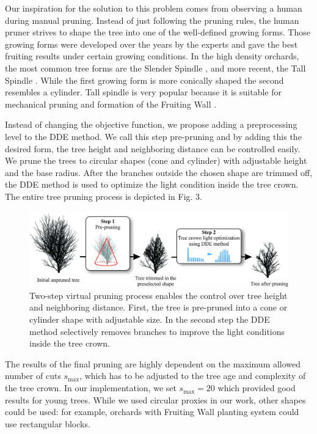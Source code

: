 \documentclass[1p]{elsarticle}
\begin{document}
Our inspiration for the solution to this problem comes from observing a
human during manual pruning. Instead of just following the pruning
rules, the human pruner strives to shape the tree into one of the
well-defined growing forms. Those growing forms were developed over the
years by the experts and gave the best fruiting results under certain
growing conditions. In the high density orchards, the most common tree
forms are the Slender Spindle \cite{weber_optimizing_2000}, and more recent, the Tall
Spindle \cite{robinson_vision_2013}. While the first growing form is more conically shaped
the second resembles a cylinder. Tall spindle is very popular because it
is suitable for mechanical pruning and formation of the Fruiting Wall
\cite{robinson_vision_2013}.

Instead of changing the objective function, we propose adding a
preprocessing level to the DDE method. We call this step pre-pruning and
by adding this the desired form, the tree height and neighboring
distance can be controlled easily. We prune the trees to circular shapes
(cone and cylinder) with adjustable height and the base radius. After
the branches outside the chosen shape are trimmed off, the DDE method is
used to optimize the light condition inside the tree crown. The entire
tree pruning process is depicted in Fig. 3.

\begin{figure}
    \centering
    \includegraphics[width=5.3in]{figs/image3.jpeg}
    \caption{Two-step virtual pruning process enables the control
over tree height and neighboring distance. First, the tree is pre-pruned
into a cone or cylinder shape with adjustable size. In the second step
the DDE method selectively removes branches to improve the light
conditions inside the tree crown.}
    \label{fig:my_label}
\end{figure}





The results of the final pruning are highly dependent on the maximum
allowed number of cuts \(s_{\mathrm{\max}}\), which has to be adjusted
to the tree age and complexity of the tree crown. In our implementation,
we set \(s_{\mathrm{\max}} = 20\) which provided good results for young
trees. While we used circular proxies in our work, other shapes could be
used: for example, orchards with Fruiting Wall planting system could use
rectangular blocks.
\end{document}

